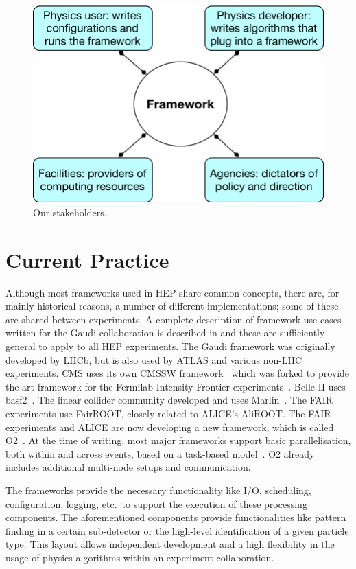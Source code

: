 \documentclass[12pt,a4paper]{article}
\begin{document}
\begin{figure}[hbt] %
\centering
\includegraphics[width=.75\textwidth]{stakeholders.pdf}
\caption{Our stakeholders. \label{fig:stakeholders}}
\end{figure}


\section{Current Practice}
\label{sec:current-practice}

Although most frameworks used in HEP share common concepts, there are,
for mainly historical reasons, a number of different implementations;
some of these are shared between experiments. A complete description
of framework use cases written for the Gaudi collaboration is
described in \cite{Maley:684466} and these are sufficiently general to apply
to all HEP experiments. The Gaudi framework \cite{Barrand:2001ny,1742-6596-219-4-042006} was originally
developed by LHCb, but is also used by ATLAS and various non-LHC
experiments. CMS uses its own CMSSW framework~\cite{Bayatian:2006nff}
which was forked to provide the art framework for the Fermilab
Intensity Frontier experiments~\cite{Green:2012gv}.  Belle II uses
basf2~\cite{1742-6596-331-3-032024}. The linear collider community
developed and uses Marlin~\cite{Gaede:2006pj}. The FAIR experiments
use FairROOT, closely related to ALICE's AliROOT. The FAIR experiments
and ALICE are now developing a new framework, which is called
O2~\cite{O2,1742-6596-664-8-082046}. At the time of writing, most major frameworks support
basic parallelisation, both within and across events, based on a
task-based model~\cite{Jones:2015soc,Clemencic:2015paa}. O2 already
includes additional multi-node setups and communication.

The frameworks provide the necessary functionality like I/O,
scheduling, configuration, logging, etc.\ to support the execution of
these processing components. The aforementioned components provide
functionalities like pattern finding in a certain sub-detector or the
high-level identification of a given particle type. This layout allows
independent development and a high flexibility in the usage of physics
algorithms within an experiment collaboration.
\end{document}
